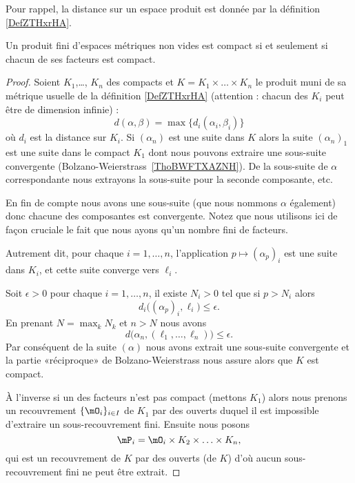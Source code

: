 Pour rappel, la distance sur un espace produit est donnée par la définition \ref{DefZTHxrHA}.
\begin{theorem}\label{THOIYmxXuu}
	Un produit fini d'espaces métriques non vides est compact si et seulement si chacun de ses facteurs est compact.
\end{theorem}

\begin{proof}
	Soient \( K_1\),\ldots, \( K_n\) des compacts et \( K=K_1\times \ldots\times K_n\) le produit muni de sa métrique usuelle de la définition \eqref{DefZTHxrHA} (attention : chacun des \( K_i\) peut être de dimension infinie) :
	\begin{equation}
		d(\alpha,\beta)=\max\{ d_i(\alpha_i,\beta_i) \}
	\end{equation}
	où \( d_i\) est la distance sur \( K_i\). Si \( (\alpha_n)\) est une suite dans \( K\) alors la suite \( (\alpha_n)_1\) est une suite dans le compact \( K_1\) dont nous pouvons extraire une sous-suite convergente (Bolzano-Weierstrass~\ref{ThoBWFTXAZNH}). De la sous-suite de \( \alpha\) correspondante nous extrayons la sous-suite pour la seconde composante, etc.

	En fin de compte nous avons une sous-suite (que nous nommons \( \alpha\) également) donc chacune des composantes est convergente. Notez que nous utilisons ici de façon cruciale le fait que nous ayons qu'un nombre fini de facteurs.

	Autrement dit, pour chaque \( i=1,\ldots, n\), l'application \( p\mapsto (\alpha_p)_i\) est une suite dans \( K_i\), et cette suite converge vers \( \ell_i\).

	Soit \( \epsilon>0\) pour chaque \( i=1,\ldots, n\), il existe \( N_i>0\) tel que si \( p>N_i\) alors
	\begin{equation}
		d_i\big( (\alpha_p)_i,\ell_i \big)\leq \epsilon.
	\end{equation}
	En prenant \( N=\max_kN_k\) et \( n>N\) nous avons
	\begin{equation}
		d\big( \alpha_n,(\ell_1,\ldots, \ell_n) \big)\leq\epsilon.
	\end{equation}
	Par conséquent de la suite \( (\alpha)\) nous avons extrait une sous-suite convergente et la partie «réciproque» de Bolzano-Weierstrass nous assure alors que \( K\) est compact.

	À l'inverse si un des facteurs n'est pas compact (mettons \( K_1\)) alors nous prenons un recouvrement \( \{ \mO_i \}_{i\in I}\) de \( K_1\) par des ouverts duquel il est impossible d'extraire un sous-recouvrement fini. Ensuite nous posons
	\begin{equation}
		\mP_i=\mO_i\times K_2\times\ldots\times K_n,
	\end{equation}
	qui est un recouvrement de \( K\) par des ouverts (de \( K\)) d'où aucun sous-recouvrement fini ne peut être extrait.
\end{proof}

